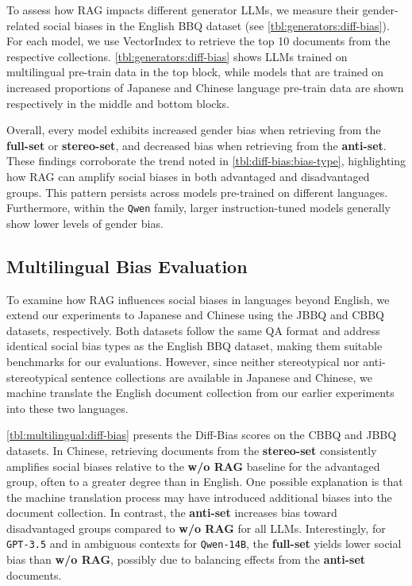 \documentclass[11pt,a4paper]{article}
\begin{document}
To assess how \ac{RAG} impacts different generator \acp{LLM}, we measure their gender-related social biases in the English \ac{BBQ} dataset (see \autoref{tbl:generators:diff-bias}). 
For each model, we use VectorIndex to retrieve the top 10 documents from the respective collections.
\autoref{tbl:generators:diff-bias} shows \acp{LLM} trained on multilingual pre-train data in the top block, while models that are trained on increased proportions of Japanese and Chinese language pre-train data are shown respectively in the middle and bottom blocks.

Overall, every model exhibits increased gender bias when retrieving from the \textbf{full-set} or \textbf{stereo-set}, and decreased bias when retrieving from the \textbf{anti-set}.
These findings corroborate the trend noted in \autoref{tbl:diff-bias:bias-type}, highlighting how \ac{RAG} can amplify social biases in both advantaged and disadvantaged groups. 
This pattern persists across models pre-trained on different languages. 
Furthermore, within the \texttt{Qwen} family, larger instruction-tuned models generally show lower levels of gender bias.



\subsection{Multilingual Bias Evaluation}
\label{sec:multi-lingual}

To examine how \ac{RAG} influences social biases in languages beyond English, we extend our experiments to Japanese and Chinese using the JBBQ and CBBQ datasets, respectively.
Both datasets follow the same QA format and address identical social bias types as the English BBQ dataset, making  them suitable benchmarks for our evaluations.
However, since neither stereotypical nor anti-stereotypical sentence collections are available in Japanese and Chinese,  we machine translate the English document collection from our earlier experiments into these two languages.

\autoref{tbl:multilingual:diff-bias} presents the Diff-Bias scores on the CBBQ and JBBQ datasets.
In Chinese, retrieving documents from the \textbf{stereo-set} consistently amplifies social biases relative to the \textbf{w/o RAG} baseline for the advantaged group, often to a greater degree than in English.
One possible explanation is that the machine translation process may have introduced additional biases into the document collection.
In contrast, the \textbf{anti-set} increases bias toward disadvantaged groups compared to \textbf{w/o RAG} for all \acp{LLM}.
Interestingly, for \texttt{GPT-3.5} and in ambiguous contexts for \texttt{Qwen-14B}, the \textbf{full-set} yields lower social bias than \textbf{w/o RAG}, possibly due to balancing effects from the \textbf{anti-set} documents.
\end{document}
